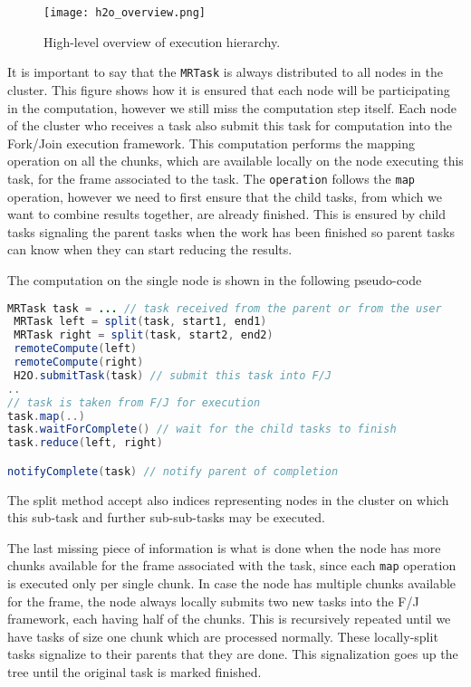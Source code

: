 	\begin{figure}
		\centering
		\texttt{[image: h2o\_overview.png]}
		\caption{High-level overview of execution hierarchy.}
		\label{fig:h2o_overview}
	\end{figure}


It is important to say that the \texttt{MRTask} is always distributed to all nodes in the cluster. This figure shows how it is ensured that each node will be participating in the computation, however we still miss the computation step itself. Each node of the cluster who receives a task also submit this task for computation into the Fork/Join execution framework. This computation performs the mapping operation on all the chunks, which are available locally on the node executing this task, for the frame associated to the task. The \texttt{operation} follows the \texttt{map} operation, however we need to first ensure that the child tasks, from which we want to combine results together, are already finished. This is ensured by child tasks signaling the parent tasks when the work has been finished so parent tasks can know when they can start reducing the results.

The computation on the single node is shown in the following pseudo-code
\begin{lstlisting}[language=Java]
 MRTask task = ... // task received from the parent or from the user
 MRTask left = split(task, start1, end1)
 MRTask right = split(task, start2, end2)
 remoteCompute(left)
 remoteCompute(right)
 H2O.submitTask(task) // submit this task into F/J
..
// task is taken from F/J for execution
task.map(..)
task.waitForComplete() // wait for the child tasks to finish
task.reduce(left, right)

notifyComplete(task) // notify parent of completion
\end{lstlisting}
The split method accept also indices representing nodes in the cluster on which this sub-task and further sub-sub-tasks may be executed.

The last missing piece of information is what is done when the node has more chunks available for the frame associated with the task, since each \texttt{map} operation is executed only per single chunk. In case the node has multiple chunks available for the frame, the node always locally submits two new tasks into the F/J framework, each having half of the chunks. This is recursively repeated until we have tasks of size one chunk which are processed normally. These locally-split tasks signalize to their parents that they are done. This signalization goes up the tree until the original task is marked finished.


